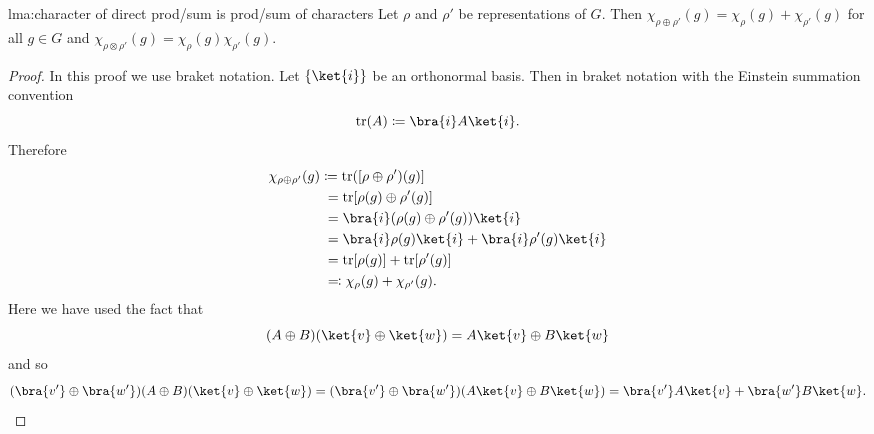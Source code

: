 \documentclass[fleqn]{NotesClass}
\DeclareMathOperator{\tr}{tr}
\newcommand*{\directsum}{\oplus}
\newcommand*{\directproduct}{\otimes}
\begin{document}
    \begin{lma}{}{lma:character of direct prod/sum is prod/sum of characters}
        Let \(\rho\) and \(\rho'\) be representations of \(G\).
        Then \(\chi_{\rho\directsum\rho'}(g) = \chi_\rho(g) + \chi_{\rho'}(g)\) for all \(g \in G\) and \(\chi_{\rho\directproduct\rho'}(g) = \chi_\rho(g)\chi_{\rho'}(g)\).
        \begin{proof}
            In this proof we use braket notation.
            Let \(\{\ket{i}\}\) be an orthonormal basis.
            Then in braket notation with the Einstein summation convention
            \begin{equation}
                \tr(A) \coloneqq \bra{i}A\ket{i}.
            \end{equation}
            Therefore
            \begin{align}
                \chi_{\rho\directsum\rho'}(g) &\coloneqq \tr([\rho\directsum\rho')(g)]\\
                &\hphantom{:}= \tr[\rho(g)\directsum\rho'(g)]\\
                &\hphantom{:}= \bra{i}(\rho(g)\directsum\rho'(g))\ket{i}\\
                &\hphantom{:}= \bra{i}\rho(g)\ket{i} + \bra{i}\rho'(g)\ket{i}\\
                &\hphantom{:}= \tr[\rho(g)] + \tr[\rho'(g)]\\
                &\hphantom{:}\eqqcolon \chi_\rho(g) + \chi_{\rho'}(g).
            \end{align}
            Here we have used the fact that
            \begin{equation}
                (A \directsum B)(\ket{v} \directsum \ket{w}) = A\ket{v} \directsum B\ket{w}
            \end{equation}
            and so
            \begin{equation}
                (\bra{v'} \directsum \bra{w'}) (A \directsum B) (\ket{v} \directsum \ket{w}) = (\bra{v'} \directsum \bra{w'}) (A\ket{v} \directsum B\ket{w}) = \bra{v'}A\ket{v} + \bra{w'}B\ket{w}.
            \end{equation}
        

\end{proof}
\end{lma}
\end{document}
